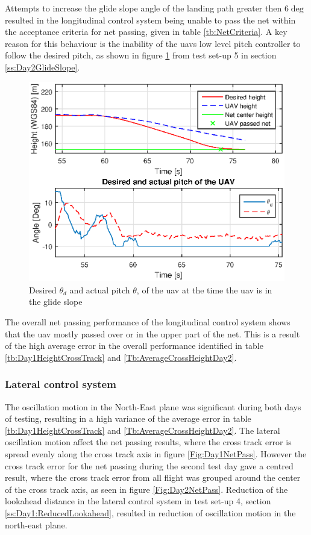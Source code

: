Attempts to increase the glide slope angle of the landing path greater then $6 \deg$ resulted in the longitudinal control system being unable to pass the net within the acceptance criteria for net passing, given in table \ref{tb:NetCriteria}. A key reason for this behaviour is the inability of the \gls{uav}s low level pitch controller to follow the desired pitch, as shown in figure \ref{Fig:Pitch1juni081328} from test set-up 5 in section \ref{ss:Day2GlideSlope}.
\newpage
\begin{figure}[H]
\centering
\includegraphics[scale=0.7]{figs/Experiment/Pitch1juni081328.eps}
\caption{Desired $\theta_d$ and actual pitch $\theta$, of the \gls{uav} at the time the \gls{uav} is in the glide slope}
\label{Fig:Pitch1juni081328}
\end{figure}
The overall net passing performance of the longitudinal control system shows that the \gls{uav} mostly passed over or in the upper part of the net. This is a result of the high average error in the overall performance identified in table \ref{tb:Day1HeightCrossTrack} and \ref{Tb:AverageCrossHeightDay2}.

\subsubsection{Lateral control system}
The oscillation motion in the North-East plane was significant during both days of testing, resulting in a high variance of the average error in table \ref{tb:Day1HeightCrossTrack} and \ref{Tb:AverageCrossHeightDay2}. The lateral oscillation motion affect the net passing results, where the cross track error is spread evenly along the cross track axis in figure \ref{Fig:Day1NetPass}. However the cross track error for the net passing during the second test day gave a centred result, where the cross track error from all flight was grouped around the center of the cross track axis, as seen in figure \ref{Fig:Day2NetPass}. Reduction of the lookahead distance in the lateral control system in test set-up 4, section \ref{ss:Day1:ReducedLookahead}, resulted in reduction of oscillation motion in the north-east plane.

